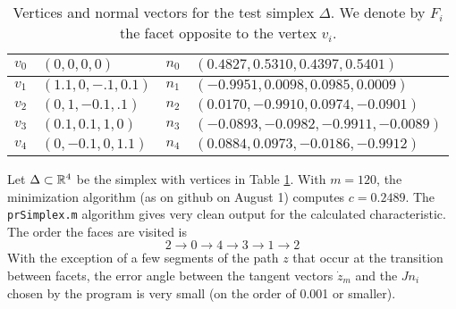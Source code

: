 \documentclass[../capacities_main.tex]{subfiles}
\begin{document}
\begin{table}[]
	\centering
	\caption{Vertices and normal vectors for the test simplex $\Delta$. We denote by $F_i$ the facet opposite to the vertex $v_i$.}
	\label{test simplex}
	\begin{tabular}{|l|l|l|l|}
		\hline
		$v_0$ & $ (0,0,0,0) $  & $n_0$ &  $(0.4827,0.5310,0.4397,0.5401)$ \\ \hline
		$v_1$ & $ (1.1 ,0 ,-.1, 0.1)$  & $n_1$ & $ (-0.9951,0.0098,0.0985,0.0009)$\\ \hline
		$v_2$ &  $(0 ,1, -0.1, .1)$  & $n_2$ &  $(0.0170,-0.9910,0.0974,-0.0901)$\\ \hline
		$v_3 $&  $(0.1, 0.1, 1, 0)$  & $n_3$ &  $(-0.0893,-0.0982,-0.9911,-0.0089)$\\ \hline
		$v_4$ & $ (0, -0.1, 0, 1.1)$  & $n_4$ &  $( 0.0884,0.0973,-0.0186,-0.9912)$\\ \hline
	\end{tabular}
\end{table}
Let $\Delta\subset {\mathbb R}^4$ be the simplex with vertices in Table \ref{test simplex}.  With $m=120$, the minimization algorithm (as on github on August 1) computes $c= 0.2489$. The \texttt{prSimplex.m} algorithm gives very clean output for the calculated characteristic. The order the faces are visited is 
\begin{equation*}
2 \rightarrow 0 \rightarrow 4 \rightarrow 3 \rightarrow 1 \rightarrow 2
\end{equation*}
With the exception of a few segments of the path $z$ that occur at the transition between facets, the error angle between the tangent vectors $\dot z_m$ and the $Jn_i$ chosen by the program is very small (on the order of 0.001 or smaller).
\end{document}
